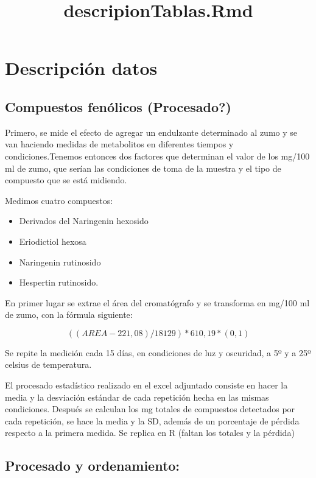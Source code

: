 \documentclass[
]{article}
\title{descripionTablas.Rmd}
\author{}
\date{\vspace{-2.5em}}
\providecommand{\tightlist}{%
  \setlength{\itemsep}{0pt}\setlength{\parskip}{0pt}}
\begin{document}
\maketitle

\hypertarget{descripciuxf3n-datos}{%
\section{Descripción datos}\label{descripciuxf3n-datos}}

\hypertarget{compuestos-fenuxf3licos-procesado}{%
\subsection{Compuestos fenólicos
(Procesado?)}\label{compuestos-fenuxf3licos-procesado}}

Primero, se mide el efecto de agregar un endulzante determinado al zumo
y se van haciendo medidas de metabolitos en diferentes tiempos y
condiciones.Tenemos entonces dos factores que determinan el valor de los
mg/100 ml de zumo, que serían las condiciones de toma de la muestra y el
tipo de compuesto que se está midiendo.

Medimos cuatro compuestos:

\begin{itemize}
\tightlist
\item
  Derivados del Naringenin hexosido
\item
  Eriodictiol hexosa
\item
  Naringenin rutinosido
\item
  Hespertin rutinosido.
\end{itemize}

En primer lugar se extrae el área del cromatógrafo y se transforma en
mg/100 ml de zumo, con la fórmula siguiente:

\[((AREA-221,08)/18129)*610,19*(0,1)\]

Se repite la medición cada 15 días, en condiciones de luz y oscuridad, a
5º y a 25º celsius de temperatura.

El procesado estadístico realizado en el excel adjuntado consiste en
hacer la media y la desviación estándar de cada repetición hecha en las
mismas condiciones. Después se calculan los mg totales de compuestos
detectados por cada repetición, se hace la media y la SD, además de un
porcentaje de pérdida respecto a la primera medida. Se replica en R
(faltan los totales y la pérdida)

\hypertarget{procesado-y-ordenamiento}{%
\subsection{Procesado y ordenamiento:}\label{procesado-y-ordenamiento}}
\end{document}
